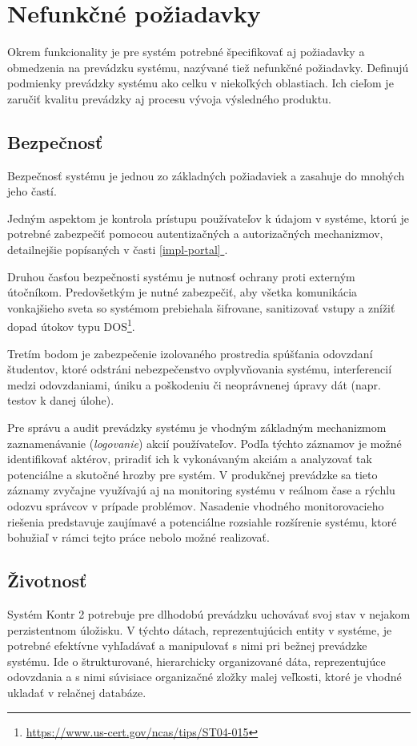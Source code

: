 \documentclass[
  digital, %
  oneside, %
  table,   %
  lof,     %
  lot,   %
]{fithesis3}
\newcommand*{\fullref}[1]{\hyperref[{#1}]{\ref*{#1} \nameref*{#1}}}
\begin{document}
\section{Nefunkčné požiadavky}

Okrem funkcionality je pre systém potrebné špecifikovať aj požiadavky a obmedzenia na prevádzku systému, nazývané tiež nefunkčné požiadavky. Definujú podmienky prevádzky systému ako celku v niekoľkých oblastiach. Ich cieľom je zaručiť kvalitu prevádzky aj procesu vývoja výsledného produktu.

\subsection{Bezpečnosť}
Bezpečnosť systému je jednou zo základných požiadaviek a zasahuje do mnohých jeho častí.

Jedným aspektom je kontrola prístupu používateľov k údajom v systéme, ktorú je potrebné zabezpečiť pomocou autentizačných a autorizačných mechanizmov, detailnejšie popísaných v časti \fullref{impl-portal}.

Druhou časťou bezpečnosti systému je nutnosť ochrany proti externým útočníkom. Predovšetkým je nutné zabezpečiť, aby všetka komunikácia vonkajšieho sveta so systémom prebiehala šifrovane, sanitizovať vstupy a znížiť dopad útokov typu DOS\footnote{\url{https://www.us-cert.gov/ncas/tips/ST04-015}}. 

Tretím bodom je zabezpečenie izolovaného prostredia spúšťania odovzdaní študentov, ktoré odstráni nebezpečenstvo ovplyvňovania systému, interferencií medzi odovzdaniami, úniku a poškodeniu či neoprávnenej úpravy dát (napr. testov k danej úlohe).

Pre správu a audit prevádzky systému je vhodným základným mechanizmom zaznamenávanie (\emph{logovanie}) akcií používateľov. Podľa týchto záznamov je možné identifikovať aktérov, priradiť ich k vykonávaným akciám a analyzovať tak potenciálne a skutočné hrozby pre systém. V produkčnej prevádzke sa tieto záznamy zvyčajne využívajú aj na monitoring systému v reálnom čase a rýchlu odozvu správcov v prípade problémov. Nasadenie vhodného monitorovacieho riešenia predstavuje zaujímavé a potenciálne rozsiahle rozšírenie systému, ktoré bohužiaľ v rámci tejto práce nebolo možné realizovať.

\subsection{Životnosť}
Systém Kontr 2 potrebuje pre dlhodobú prevádzku uchovávať svoj stav v nejakom perzistentnom úložisku. V týchto dátach, reprezentujúcich entity v systéme, je potrebné efektívne vyhľadávať a manipulovať s nimi pri bežnej prevádzke systému. Ide o štrukturované, hierarchicky organizované dáta, reprezentujúce odovzdania a s nimi súvisiace organizačné zložky malej veľkosti, ktoré je vhodné ukladať v relačnej databáze\cite{fowler-pattern-application-arch}. 
\end{document}
